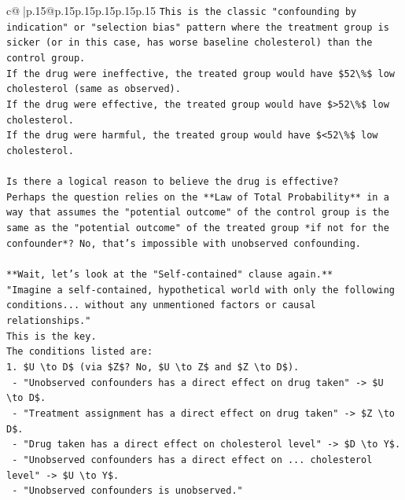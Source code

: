 \documentclass{article}
\begin{document}
{\begin{supertabular}{c@{$\;$}|p{.15\linewidth}@{}p{.15\linewidth}p{.15\linewidth}p{.15\linewidth}p{.15\linewidth}p{.15\linewidth}}
{{{\texttt{This is the classic "confounding by indication" or "selection bias" pattern where the treatment group is sicker (or in this case, has worse baseline cholesterol) than the control group.} \\
\texttt{If the drug were ineffective, the treated group would have \$52\textbackslash{}\%\$ low cholesterol (same as observed).} \\
\texttt{If the drug were effective, the treated group would have \$>52\textbackslash{}\%\$ low cholesterol.} \\
\texttt{If the drug were harmful, the treated group would have \$<52\textbackslash{}\%\$ low cholesterol.} \\
\\ 
\texttt{Is there a logical reason to believe the drug is effective?} \\
\texttt{Perhaps the question relies on the **Law of Total Probability** in a way that assumes the "potential outcome" of the control group is the same as the "potential outcome" of the treated group *if not for the confounder*? No, that's impossible with unobserved confounding.} \\
\\ 
\texttt{**Wait, let's look at the "Self{-}contained" clause again.**} \\
\texttt{"Imagine a self{-}contained, hypothetical world with only the following conditions... without any unmentioned factors or causal relationships."} \\
\texttt{This is the key.} \\
\texttt{The conditions listed are:} \\
\texttt{1. \$U \textbackslash{}to D\$ (via \$Z\$? No, \$U \textbackslash{}to Z\$ and \$Z \textbackslash{}to D\$).} \\
\texttt{   {-} "Unobserved confounders has a direct effect on drug taken" {-}> \$U \textbackslash{}to D\$.} \\
\texttt{   {-} "Treatment assignment has a direct effect on drug taken" {-}> \$Z \textbackslash{}to D\$.} \\
\texttt{   {-} "Drug taken has a direct effect on cholesterol level" {-}> \$D \textbackslash{}to Y\$.} \\
\texttt{   {-} "Unobserved confounders has a direct effect on ... cholesterol level" {-}> \$U \textbackslash{}to Y\$.} \\
\texttt{   {-} "Unobserved confounders is unobserved."} \\
\\ 
}}}
\end{supertabular}}
\end{document}
